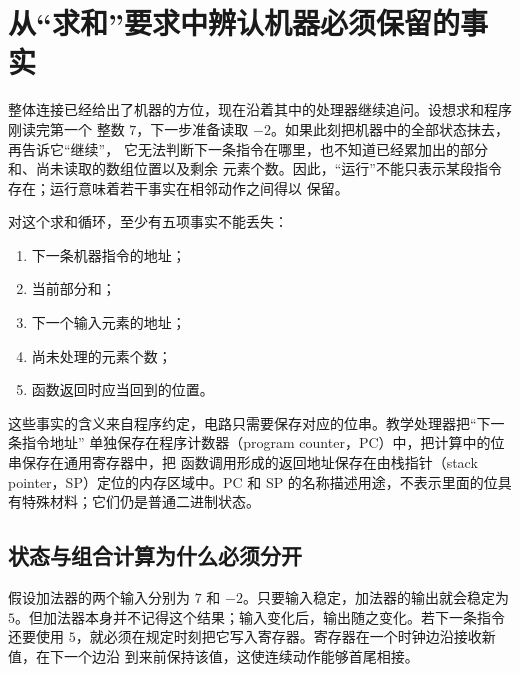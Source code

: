 \section{从“求和”要求中辨认机器必须保留的事实}

整体连接已经给出了机器的方位，现在沿着其中的处理器继续追问。设想求和程序刚读完第一个
整数 \(7\)，下一步准备读取 \(-2\)。如果此刻把机器中的全部状态抹去，再告诉它“继续”，
它无法判断下一条指令在哪里，也不知道已经累加出的部分和、尚未读取的数组位置以及剩余
元素个数。因此，“运行”不能只表示某段指令存在；运行意味着若干事实在相邻动作之间得以
保留。

对这个求和循环，至少有五项事实不能丢失：

\begin{enumerate}
\item 下一条机器指令的地址；
\item 当前部分和；
\item 下一个输入元素的地址；
\item 尚未处理的元素个数；
\item 函数返回时应当回到的位置。
\end{enumerate}

这些事实的含义来自程序约定，电路只需要保存对应的位串。教学处理器把“下一条指令地址”
单独保存在程序计数器（program counter，PC）中，把计算中的位串保存在通用寄存器中，把
函数调用形成的返回地址保存在由栈指针（stack pointer，SP）定位的内存区域中。PC 和 SP
的名称描述用途，不表示里面的位具有特殊材料；它们仍是普通二进制状态。

\subsection{状态与组合计算为什么必须分开}

假设加法器的两个输入分别为 \(7\) 和 \(-2\)。只要输入稳定，加法器的输出就会稳定为
\(5\)。但加法器本身并不记得这个结果；输入变化后，输出随之变化。若下一条指令还要使用
\(5\)，就必须在规定时刻把它写入寄存器。寄存器在一个时钟边沿接收新值，在下一个边沿
到来前保持该值，这使连续动作能够首尾相接。

\begin{center}
\end{center}

